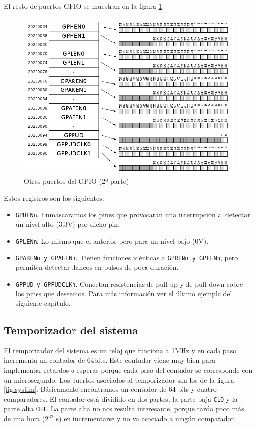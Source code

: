 El resto de puertos GPIO se muestran en la figura \ref{fig:gpio3}.

\begin{figure}[h]
  \centering
    \includegraphics[width=14cm]{graphs/gpio3.png}
  \caption{Otros puertos del GPIO (2ª parte)}
  \label{fig:gpio3}
\end{figure}

Estos registros son los siguientes:

\begin{itemize}
  \item {\tt GPHENn}. Enmascaramos los pines que provocarán una interrupción al detectar un
        nivel alto (3.3V) por dicho pin.
  \item {\tt GPLENn}. Lo mismo que el anterior pero para un nivel bajo (0V).
  \item {\tt GPARENn y GPAFENn}. Tienen funciones idénticas a {\tt GPRENn y GPFENn}, pero permiten
        detectar flancos en pulsos de poca duración.
  \item {\tt GPPUD y GPPUDCLKn}. Conectan resistencias de pull-up y de pull-down sobre los pines
        que deseemos. Para más información ver el último ejemplo del siguiente capítulo.
\end{itemize}

\subsection{Temporizador del sistema}

El temporizador del sistema es un reloj que funciona a 1MHz y en cada paso incrementa un
contador de 64bits. Este contador viene muy bien para implementar retardos o esperas
porque cada paso del contador se corresponde con un microsegundo. Los puertos asociados
al temporizador son los de la figura \ref{fig:systim}. Básicamente encontramos un contador
de 64 bits y cuatro comparadores. El contador está dividido en
dos partes, la parte baja {\tt CLO} y la parte alta {\tt CHI}. La parte alta no nos resulta
interesante, porque tarda poco más de una hora ($2^{32}$ \micro s) en incrementarse y no
va asociado a ningún comparador.

